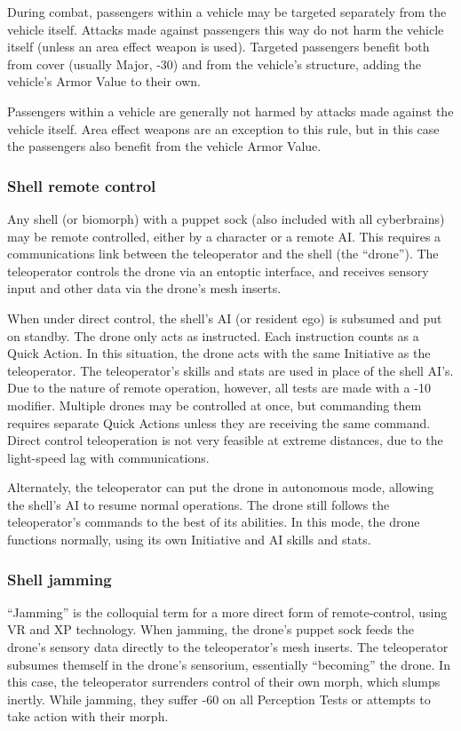 During combat, passengers within a vehicle may be targeted separately from the vehicle itself. Attacks made against passengers this way do not harm the vehicle itself (unless an area effect weapon is used). Targeted passengers benefit both from cover (usually Major, -30) and from the vehicle’s structure, adding the vehicle’s Armor Value to their own. 

Passengers within a vehicle are generally not harmed by attacks made against the vehicle itself. Area effect weapons are an exception to this rule, but in this case the passengers also benefit from the vehicle Armor Value. 

\subsubsection{Shell remote control} 

Any shell (or biomorph) with a puppet sock (also included with all cyberbrains) may be remote controlled, either by a character or a remote AI. This requires a communications link between the teleoperator and the shell (the ``drone”). The teleoperator controls the drone via an entoptic interface, and receives sensory input and other data via the drone’s mesh inserts. 

When under direct control, the shell’s AI (or resident ego) is subsumed and put on standby. The drone only acts as instructed. Each instruction counts as a Quick Action. In this situation, the drone acts with the same Initiative as the teleoperator. The teleoperator’s skills and stats are used in place of the shell AI’s. Due to the nature of remote operation, however, all tests are made with a -10 modifier. Multiple drones may be controlled at once, but commanding them requires separate Quick Actions unless they are receiving the same command. Direct control teleoperation is not very feasible at extreme distances, due to the light-speed lag with communications. 

Alternately, the teleoperator can put the drone in autonomous mode, allowing the shell’s AI to resume normal operations. The drone still follows the teleoperator’s commands to the best of its abilities. In this mode, the drone functions normally, using its own Initiative and AI skills and stats. 

\subsubsection{Shell jamming} 

``Jamming'' is the colloquial term for a more direct form of remote-control, using VR and XP technology. When jamming, the drone’s puppet sock feeds the drone’s sensory data directly to the teleoperator’s mesh inserts. The teleoperator subsumes themself in the drone’s sensorium, essentially ``becoming'' the drone. In this case, the teleoperator surrenders control of their own morph, which slumps inertly. While jamming, they suffer -60 on all Perception Tests or attempts to take action with their morph. 

